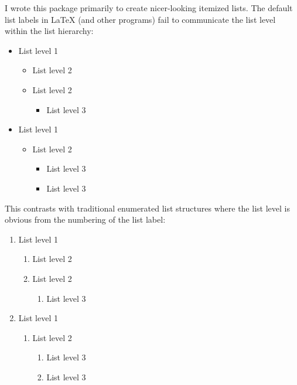 \documentclass{beery}
\begin{document}
I wrote this package primarily to create nicer-looking itemized lists.
The default list labels in \LaTeX{} (and other programs) fail to communicate the list level within the list hierarchy:

\begin{multicols}{2}
  \begin{itemize}[label=\textbullet]
    \item List level 1
    \begin{itemize}[label=\textbf{--}]
      \item List level 2
      \item List level 2
      \begin{itemize}[label=\textasteriskcentered]
        \item List level 3
      \end{itemize}
    \end{itemize}
    \item List level 1
    \begin{itemize}[label=\textbf{--}]
      \item List level 2
      \begin{itemize}[label=\textasteriskcentered]
        \item List level 3
        \item List level 3
      \end{itemize}
    \end{itemize}
  \end{itemize}
\end{multicols}

This contrasts with traditional enumerated list structures where the list level is obvious from the numbering of the list label:

\begin{multicols}{2}
  \begin{enumerate}
    \item List level 1
    \begin{enumerate}
      \item List level 2
      \item List level 2
      \begin{enumerate}
        \item List level 3
      \end{enumerate}
    \end{enumerate}
    \item List level 1
    \begin{enumerate}
      \item List level 2
      \begin{enumerate}
        \item List level 3
        \item List level 3
      \end{enumerate}
    \end{enumerate}
  \end{enumerate}
\end{multicols}
\end{document}
